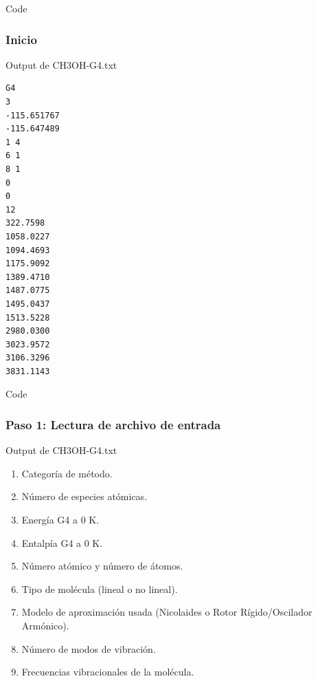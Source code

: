 \documentclass{beamer}
\begin{document}
\begin{frame}[fragile]{Code}
\frametitle{Inicio}

\begin{block}{Output de CH3OH-G4.txt}
\begin{lstlisting}
G4
3
-115.651767
-115.647489
1 4
6 1
8 1
0
0
12
322.7598
1058.0227
1094.4693
1175.9092
1389.4710
1487.0775
1495.0437
1513.5228
2980.0300
3023.9572
3106.3296
3831.1143
\end{lstlisting}
\end{block}
\end{frame}
\begin{frame}[fragile]{Code}
\frametitle{Paso 1: Lectura de archivo de entrada}

\begin{block}{Output de CH3OH-G4.txt}
\begin{enumerate}		
	\item Categoría de método. 
	\item Número de especies atómicas.
	\item Energía G4 a 0 K.
	\item Entalpía G4 a 0 K.
	\item Número atómico y número de átomos.
	\item Tipo de molécula (lineal o no lineal).
	\item Modelo de aproximación usada (Nicolaides o Rotor Rígido/Oscilador Armónico).
	\item Número de modos de vibración.
	\item Frecuencias vibracionales de la molécula.
\end{enumerate}
\end{block}
\end{frame}
\end{document}
